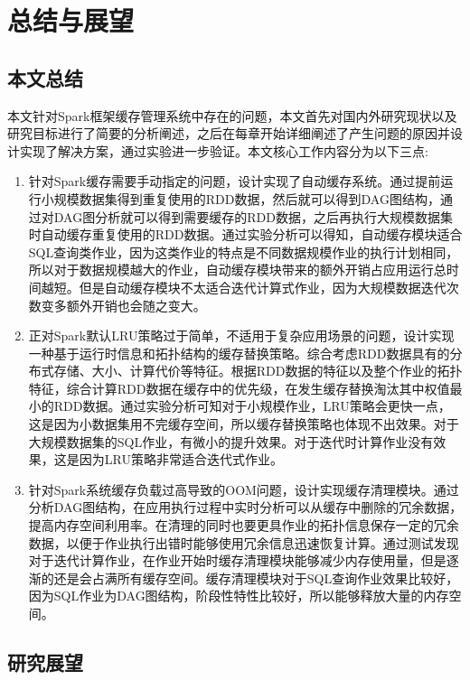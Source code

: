 \chapter{总结与展望}\label{chap:guide}

\section{本文总结}

本文针对Spark框架缓存管理系统中存在的问题，本文首先对国内外研究现状以及研究目标进行了简要的分析阐述，之后在每章开始详细阐述了产生问题的原因并设计实现了解决方案，通过实验进一步验证。本文核心工作内容分为以下三点:

\begin{enumerate}
    \item 针对Spark缓存需要手动指定的问题，设计实现了自动缓存系统。通过提前运行小规模数据集得到重复使用的RDD数据，然后就可以得到DAG图结构，通过对DAG图分析就可以得到需要缓存的RDD数据，之后再执行大规模数据集时自动缓存重复使用的RDD数据。通过实验分析可以得知，自动缓存模块适合SQL查询类作业，因为这类作业的特点是不同数据规模作业的执行计划相同，所以对于数据规模越大的作业，自动缓存模块带来的额外开销占应用运行总时间越短。但是自动缓存模块不太适合迭代计算式作业，因为大规模数据迭代次数变多额外开销也会随之变大。
    \item 正对Spark默认LRU策略过于简单，不适用于复杂应用场景的问题，设计实现一种基于运行时信息和拓扑结构的缓存替换策略。综合考虑RDD数据具有的分布式存储、大小、计算代价等特征。根据RDD数据的特征以及整个作业的拓扑特征，综合计算RDD数据在缓存中的优先级，在发生缓存替换淘汰其中权值最小的RDD数据。通过实验分析可知对于小规模作业，LRU策略会更快一点，这是因为小数据集用不完缓存空间，所以缓存替换策略也体现不出效果。对于大规模数据集的SQL作业，有微小的提升效果。对于迭代时计算作业没有效果，这是因为LRU策略非常适合迭代式作业。
    \item 针对Spark系统缓存负载过高导致的OOM问题，设计实现缓存清理模块。通过分析DAG图结构，在应用执行过程中实时分析可以从缓存中删除的冗余数据，提高内存空间利用率。在清理的同时也要更具作业的拓扑信息保存一定的冗余数据，以便于作业执行出错时能够使用冗余信息迅速恢复计算。通过测试发现对于迭代计算作业，在作业开始时缓存清理模块能够减少内存使用量，但是逐渐的还是会占满所有缓存空间。缓存清理模块对于SQL查询作业效果比较好，因为SQL作业为DAG图结构，阶段性特性比较好，所以能够释放大量的内存空间。
\end{enumerate}

\section{研究展望}


